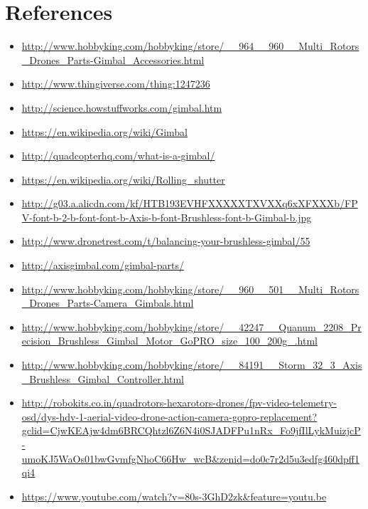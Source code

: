 \documentclass[11pt,a4paper]{article}
\begin{document}
	\section{References}
	\begin{itemize}
		\item \url{http://www.hobbyking.com/hobbyking/store/__964__960__Multi_Rotors_Drones_Parts-Gimbal_Accessories.html}
		\item \url{http://www.thingiverse.com/thing:1247236}
		\item \url{http://science.howstuffworks.com/gimbal.htm}
		\item \url{https://en.wikipedia.org/wiki/Gimbal}
		\item \url{http://quadcopterhq.com/what-is-a-gimbal/}
		\item \url{https://en.wikipedia.org/wiki/Rolling_shutter}
		\item \url{http://g03.a.alicdn.com/kf/HTB193EVHFXXXXXTXVXXq6xXFXXXb/FPV-font-b-2-b-font-font-b-Axis-b-font-Brushless-font-b-Gimbal-b.jpg}
		\item \url{http://www.dronetrest.com/t/balancing-your-brushless-gimbal/55}
		\item \url{http://axisgimbal.com/gimbal-parts/}
		\item \url{http://www.hobbyking.com/hobbyking/store/__960__501__Multi_Rotors_Drones_Parts-Camera_Gimbals.html}
		\item \url{http://www.hobbyking.com/hobbyking/store/__42247__Quanum_2208_Precision_Brushless_Gimbal_Motor_GoPRO_size_100_200g_.html}
		\item \url{http://www.hobbyking.com/hobbyking/store/__84191__Storm_32_3_Axis_Brushless_Gimbal_Controller.html}
		\item \url{http://robokits.co.in/quadrotors-hexarotors-drones/fpv-video-telemetry-osd/dys-hdv-1-aerial-video-drone-action-camera-gopro-replacement?gclid=CjwKEAjw4dm6BRCQhtzl6Z6N4i0SJADFPu1nRx_Fo9jfIlLykMuizjcP-umoKJ5WaOs01bwGvmfgNhoC66Hw_wcB&zenid=do0c7r2d5u3edfg460dpff1qi4}
		\item \url{https://www.youtube.com/watch?v=80s-3GhD2zk&feature=youtu.be}
	\end{itemize}
\end{document}
